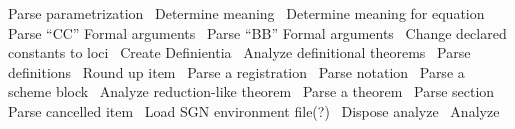 \nwenddocs{}\plusendmoddef\nwstartdeflinemarkup{}\nwenddeflinemarkup
\LA{}Parse parametrization~{\nwtagstyle{}}\RA{}
\LA{}Determine meaning~{\nwtagstyle{}}\RA{}
\LA{}Determine meaning for equation~{\nwtagstyle{}}\RA{}
\LA{}Parse ``CC'' Formal arguments~{\nwtagstyle{}}\RA{}
\LA{}Parse ``BB'' Formal arguments~{\nwtagstyle{}}\RA{}
\LA{}Change declared constants to loci~{\nwtagstyle{}}\RA{}
\LA{}Create Definientia~{\nwtagstyle{}}\RA{}
\LA{}Analyze definitional theorems~{\nwtagstyle{}}\RA{}
\LA{}Parse definitions~{\nwtagstyle{}}\RA{}
\LA{}Round up item~{\nwtagstyle{}}\RA{}
\LA{}Parse a registration~{\nwtagstyle{}}\RA{}
\LA{}Parse notation~{\nwtagstyle{}}\RA{}
\LA{}Parse a scheme block~{\nwtagstyle{}}\RA{}
\LA{}Analyze reduction-like theorem~{\nwtagstyle{}}\RA{}
\LA{}Parse a theorem~{\nwtagstyle{}}\RA{}
\LA{}Parse section~{\nwtagstyle{}}\RA{}
\LA{}Parse cancelled item~{\nwtagstyle{}}\RA{}
\LA{}Load SGN environment file(?)~{\nwtagstyle{}}\RA{}
\LA{}Dispose analyze~{\nwtagstyle{}}\RA{}
\LA{}Analyze~{\nwtagstyle{}}\RA{}
\nwendcode{}\nwdocspar

